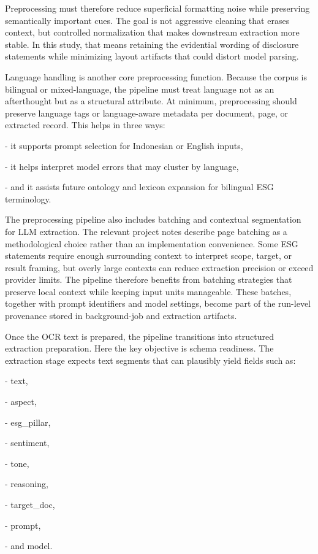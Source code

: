 \documentclass{article}
\begin{document}
Preprocessing must therefore reduce superficial formatting noise while preserving semantically important cues. The goal is not aggressive cleaning that erases context, but controlled normalization that makes downstream extraction more stable. In this study, that means retaining the evidential wording of disclosure statements while minimizing layout artifacts that could distort model parsing.

Language handling is another core preprocessing function. Because the corpus is bilingual or mixed-language, the pipeline must treat language not as an afterthought but as a structural attribute. At minimum, preprocessing should preserve language tags or language-aware metadata per document, page, or extracted record. This helps in three ways:

- it supports prompt selection for Indonesian or English inputs,

- it helps interpret model errors that may cluster by language,

- and it assists future ontology and lexicon expansion for bilingual ESG terminology.

The preprocessing pipeline also includes batching and contextual segmentation for LLM extraction. The relevant project notes describe page batching as a methodological choice rather than an implementation convenience. Some ESG statements require enough surrounding context to interpret scope, target, or result framing, but overly large contexts can reduce extraction precision or exceed provider limits. The pipeline therefore benefits from batching strategies that preserve local context while keeping input units manageable. These batches, together with prompt identifiers and model settings, become part of the run-level provenance stored in background-job and extraction artifacts.

Once the OCR text is prepared, the pipeline transitions into structured extraction preparation. Here the key objective is schema readiness. The extraction stage expects text segments that can plausibly yield fields such as:

- text,

- aspect,

- esg\_pillar,

- sentiment,

- tone,

- reasoning,

- target\_doc,

- prompt,

- and model.
\end{document}
